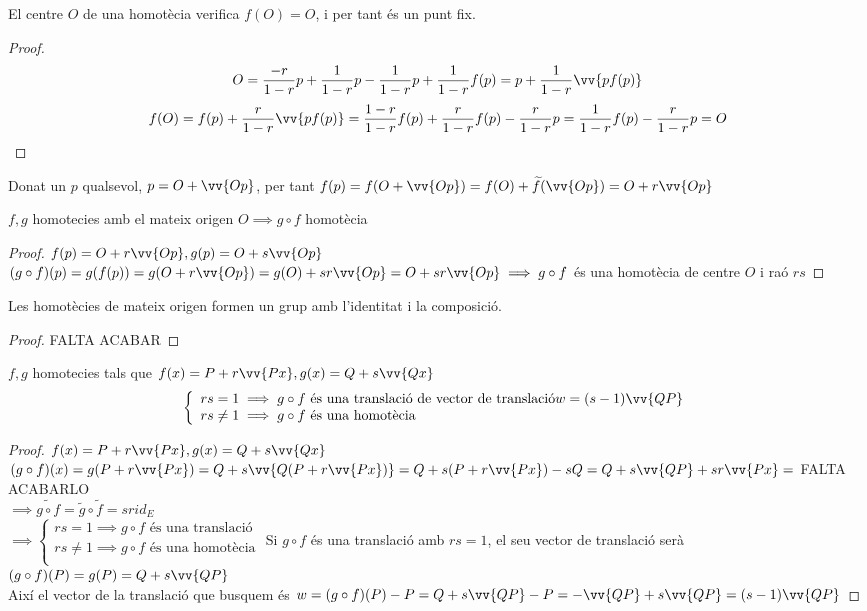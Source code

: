 \begin{prop}
	El centre $O$ de una homotècia verifica $f(O)=O$, i per tant és un punt fix.
\end{prop}
\begin{proof}
	\[O=\frac{-r}{1-r}p+\frac{1}{1-r}p-\frac{1}{1-r}p+\frac{1}{1-r}f(p)=p+\frac{1}{1-r}\vv{pf(p)}\]
	\[f(O)=f(p)+\frac{r}{1-r}\vv{pf(p)}=\frac{1-r}{1-r}f(p)+\frac{r}{1-r}f(p)-\frac{r}{1-r}p=\frac{1}{1-r}f(p)-\frac{r}{1-r}p=O\]
\end{proof}

Donat un $p$ qualsevol, $p=O+\vv{Op}$, per tant $f(p)=f(O+\vv{Op})=f(O)+\widetilde{f}(\vv{Op})=O+r\vv{Op}$

\begin{prop}
	$f,g$ homotecies amb el mateix origen $O\implies g\circ f$ homotècia
\end{prop}
\begin{proof}
	$f(p)=O+r\vv{Op},g(p)=O+s\vv{Op}$ \\
	$(g\circ f)(p)=g(f(p))=g(O+r\vv{Op})=g(O)+sr\vv{Op}=O+sr\vv{Op}\implies g\circ f$ és una homotècia de centre $O$ i raó $rs$
\end{proof}

\begin{prop}
	Les homotècies de mateix origen formen un grup amb l'identitat i la composició.
\end{prop}
\begin{proof}
	FALTA ACABAR
\end{proof}

\begin{prop}
	$f,g$ homotecies tals que $f(x)=P+r\vv{Px},g(x)=Q+s\vv{Qx}$ \\ 
	\[\left\{\begin{array}{l}
		rs=1\implies g\circ f\text{ és una translació de vector de translació} w=(s-1)\vv{QP} \\
		rs\neq 1\implies g\circ f\text{ és una homotècia} \\
	\end{array}\right.\]
\end{prop}
\begin{proof}
	$f(x)=P+r\vv{Px},g(x)=Q+s\vv{Qx}$ \bigskip \\
	$(g\circ f)(x)=g(P+r\vv{Px})=Q+s\vv{Q(P+r\vv{Px})}=Q+s(P+r\vv{Px})-sQ=Q+s\vv{QP}+sr\vv{Px}=$ FALTA ACABARLO \\
	$\implies\widetilde{g\circ f}=\widetilde{g}\circ\widetilde{f}=srid_E$ \\
	$\implies\left\{\begin{array}{l}
		rs=1\implies g\circ f\text{ és una translació} \\
		rs\neq 1\implies g\circ f\text{ és una homotècia} \\
	\end{array}\right.$
	Si $g\circ f$ és una translació amb $rs=1$, el seu vector de translació serà \\
	$(g\circ f)(P)=g(P)=Q+s\vv{QP}$ \\
	Així el vector de la translació que busquem és
	$w=(g\circ f)(P)-P=Q+s\vv{QP}-P=-\vv{QP}+s\vv{QP}=(s-1)\vv{QP}$
\end{proof}

